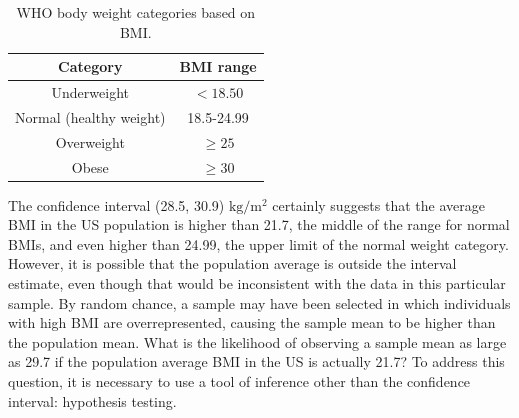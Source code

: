 \begin{spacing}{1.5}

\begin{table}[h!]
	\begin{center}
		\begin{tabular}{|c|c|}
			\hline 
			Category & BMI range\tabularnewline
			\hline 
			\hline 
			Underweight & $<18.50$\tabularnewline
			\hline 
			Normal (healthy weight) & 18.5-24.99\tabularnewline
			\hline 
			Overweight & $\geq 25$\tabularnewline
			\hline 
			Obese & $\geq30$\tabularnewline
			\hline
		\end{tabular}
		\caption{WHO body weight categories based on BMI.} 
		\label{whoBmiGuidelines}
	\end{center}
\end{table}

The confidence interval (28.5, 30.9) $\text{kg}/\text{m}{^2}$ certainly suggests that the average BMI in the US population is higher than 21.7, the middle of the range for normal BMIs, and even higher than 24.99, the upper limit of the normal weight category. However, it is possible that the population average is outside the interval estimate, even though that would be inconsistent with the data in this particular sample. By random chance, a sample may have been selected in which individuals with high BMI are overrepresented, causing the sample mean to be higher than the population mean. What is the likelihood of observing a sample mean as large as 29.7 if the population average BMI in the US is actually 21.7? To address this question, it is necessary to use a tool of inference other than the confidence interval: hypothesis testing.

\end{spacing}
